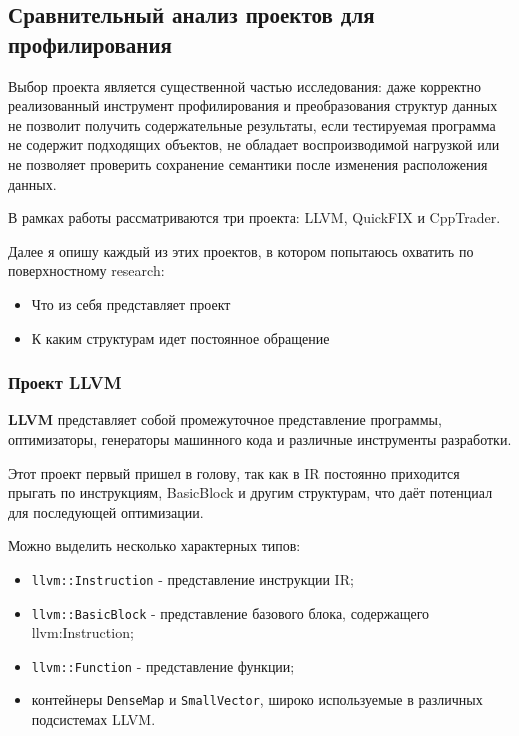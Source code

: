 \documentclass[a4paper,12pt]{article}
\begin{document}
\subsection{Сравнительный анализ проектов для профилирования}

Выбор проекта является существенной
частью исследования: даже корректно реализованный инструмент профилирования и
преобразования структур данных не позволит получить содержательные результаты,
если тестируемая программа не содержит подходящих объектов, не обладает
воспроизводимой нагрузкой или не позволяет проверить сохранение семантики после
изменения расположения данных.

В рамках работы рассматриваются три проекта: LLVM, QuickFIX и CppTrader.

Далее я опишу каждый из этих проектов, в котором попытаюсь охватить по
поверхностному research:

\begin{itemize}
    \item Что из себя представляет проект
    \item К каким структурам идет постоянное обращение
\end{itemize}

\subsubsection{Проект LLVM}

\textbf{LLVM} представляет собой промежуточное представление программы, оптимизаторы,
генераторы машинного кода и различные инструменты разработки.

Этот проект первый пришел в голову, так как в IR постоянно приходится прыгать по
инструкциям, BasicBlock и другим структурам, что даёт потенциал для последующей
оптимизации.

Можно выделить несколько характерных типов:

\begin{itemize}
    \item \texttt{llvm::Instruction} - представление инструкции IR; 
    \item \texttt{llvm::BasicBlock} - представление базового блока, содержащего 
        llvm:Instruction;
    \item \texttt{llvm::Function} - представление функции;
    \item контейнеры \texttt{DenseMap} и \texttt{SmallVector}, широко используемые
    в различных подсистемах LLVM.
\end{itemize}
\end{document}
